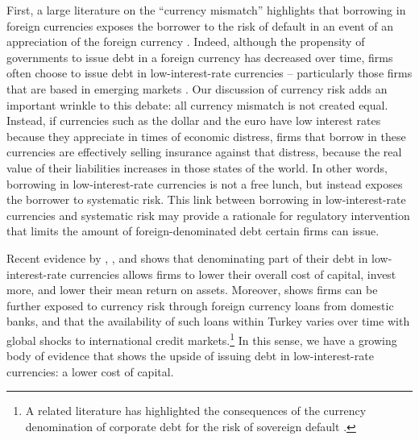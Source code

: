 \documentclass{ar-1col}
\begin{document}
First, a large literature on the ``currency mismatch'' highlights that borrowing in foreign currencies exposes the borrower to the risk of default in an event of an appreciation of the foreign currency \citep[e.g]{EichengreenHausmann1999,cespedes2004balance}. Indeed, although the propensity of governments to issue debt in a foreign currency has decreased over time, firms often choose to issue debt in low-interest-rate currencies -- particularly those firms that are based in emerging markets \citep{DuSchreger2016}. Our discussion of currency risk adds an important wrinkle to this debate: all currency mismatch is not created equal. Instead, if currencies such as the dollar and the euro have low interest rates because they appreciate in times of economic distress, firms that borrow in these currencies are effectively selling insurance against that distress, because the real value of their liabilities increases in those states of the world. In other words, borrowing in low-interest-rate currencies is not a free lunch, but instead exposes the borrower to systematic risk. This link between borrowing in low-interest-rate currencies and systematic risk may provide a rationale for regulatory intervention that limits the amount of foreign-denominated debt certain firms can issue.

Recent evidence by \citet{liao2020}, \citet{Richers2020}, and \citet{SalomaoVarela2019} shows that denominating part of their debt in low-interest-rate currencies allows firms to lower their overall cost of capital, invest more, and lower their mean return on assets. Moreover, \citep{KalemliOzcanetal2019} shows firms can be further exposed to currency risk through foreign currency loans from domestic banks, and that the availability of such loans within Turkey varies over time with global shocks to international credit markets.\footnote{A related literature has highlighted the consequences of the currency denomination of corporate debt for the risk of sovereign default \citep{DuSchreger2016, OttonelloPerez2019}.} In this sense, we have a growing body of evidence that shows the upside of issuing debt in low-interest-rate currencies: a lower cost of capital. 
\end{document}
